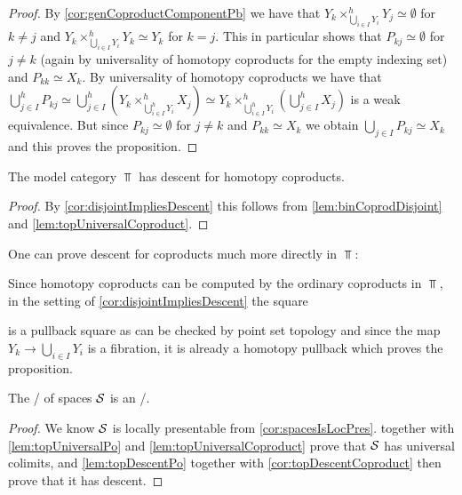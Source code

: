 \begin{corollary}
\begin{proof}
        By \cref{cor:genCoproductComponentPb} we have that $Y_k\times_{\bigcup\limits_{i\in I}Y_i}^h Y_j\simeq\emptyset$ for $k\neq j$ and $Y_k\times_{\bigcup\limits_{i\in I}Y_i}^h Y_k\simeq Y_k$ for $k=j$.
        This in particular shows that $P_{kj}\simeq\emptyset$ for $j\neq k$ (again by universality of homotopy coproducts for the empty indexing set) and $P_{kk}\simeq X_k$.
        By universality of homotopy coproducts we have that $\bigcup\limits_{j\in I}^hP_{kj}\simeq\bigcup\limits_{j\in I}^h\left(Y_k\times_{\bigcup\limits_{i\in I}^hY_i}^hX_j\right)\simeq Y_k\times_{\bigcup\limits_{i\in I}^hY_i}^h\left(\bigcup\limits_{j\in I}^hX_j\right)$ is a weak equivalence.
        But since $P_{kj}\simeq\emptyset$ for $j\neq k$ and $P_{kk}\simeq X_k$ we obtain $\bigcup\limits_{j\in I}P_{kj}\simeq X_k$ and this proves the proposition.
    \end{proof}
\end{corollary}
\begin{corollary}\label{cor:topDescentCoproduct}
    The model category $\Top$ has descent for homotopy coproducts.
    \begin{proof}
        By \cref{cor:disjointImpliesDescent} this follows from \cref{lem:binCoprodDisjoint} and \cref{lem:topUniversalCoproduct}.
    \end{proof}
\end{corollary}
\begin{remark}
    One can prove descent for coproducts much more directly in $\Top$:
    
    Since homotopy coproducts can be computed by the ordinary coproducts in $\Top$, in the setting of \cref{cor:disjointImpliesDescent} the square
    \begin{center}
    \end{center}
    is a pullback square as can be checked by point set topology and since the map $Y_k\to\bigcup\limits_{i\in I}Y_i$ is a fibration, it is already a homotopy pullback which proves the proposition.
\end{remark}
\begin{corollary}
    The \inftycat/ of spaces $\mathcal{S}$ is an \inftytop/.
    \begin{proof}
        We know $\mathcal{S}$ is locally presentable from \cref{cor:spacesIsLocPres}.
         together with \cref{lem:topUniversalPo} and \cref{lem:topUniversalCoproduct} prove that $\mathcal{S}$ has universal colimits, and \cref{lem:topDescentPo} together with \cref{cor:topDescentCoproduct} then prove that it has descent.
    \end{proof}
\end{corollary}